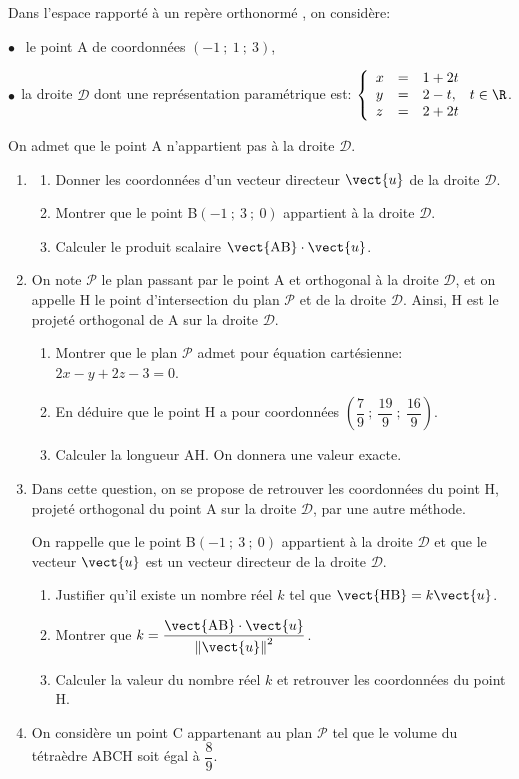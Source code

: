 \medskip

Dans l'espace rapporté à un repère orthonormé \Oijk, on considère:

$\bullet~~$ le point A de coordonnées $(-1~;~1~;~3)$,

$\bullet~~$la droite $\mathcal{D}$ dont une représentation paramétrique est: $\left\{\begin{array}{l c l}
x&=&1+2t\\y &=& 2 - t,\\z&=& 2+2t
\end{array}\right.  t \in \R$.

On admet que le point A n'appartient pas à la droite $\mathcal{D}$.

\medskip

\begin{enumerate}
\item 
	\begin{enumerate}
		\item Donner les coordonnées d'un vecteur directeur $\vect{u}$ de la droite $\mathcal{D}$.
		

		\item Montrer que le point B$(-1~;~3~;~0)$ appartient à la droite $\mathcal{D}$.
		\item Calculer le produit scalaire $\vect{\text{AB}} \cdot \vect{u}$.
	\end{enumerate}	
\item On note $\mathcal{P}$ le plan passant par le point A et orthogonal à la droite $\mathcal{D}$, et on appelle H le point d'intersection du plan $\mathcal{P}$ et de la droite $\mathcal{D}$. Ainsi, H est le projeté orthogonal de A sur la droite $\mathcal{D}$.
	\begin{enumerate}
		\item Montrer que le plan $\mathcal{P}$ admet pour équation cartésienne: $2x - y + 2z - 3 = 0$.
		\item En déduire que le point H a pour coordonnées $\left(\dfrac79~;~\dfrac{19}{9}~;~\dfrac{16}{9}\right)$.
		\item Calculer la longueur AH. On donnera une valeur exacte.
	\end{enumerate}	
\item Dans cette question, on se propose de retrouver les coordonnées du point H, projeté orthogonal du point A sur la droite $\mathcal{D}$, par une autre méthode.

On rappelle que le point B$(-1~;~3~;~0)$ appartient à la droite $\mathcal{D}$ et que le vecteur $\vect{u}$ est un vecteur directeur de la droite $\mathcal{D}$.
	\begin{enumerate}
		\item Justifier qu'il existe un nombre réel $k$ tel que $\vect{\text{HB}} = k\vect{u}$.
		\item Montrer que $k = \dfrac{\vect{\text{AB}} \cdot \vect{u}}{\left\|\vect{u}\right\|^2}$.
		\item Calculer la valeur du nombre réel $k$ et retrouver les coordonnées du point H.
	\end{enumerate}
\item On considère un point C appartenant au plan $\mathcal{P}$ tel que le volume du tétraèdre ABCH soit égal à $\dfrac89$.


\end{enumerate}
